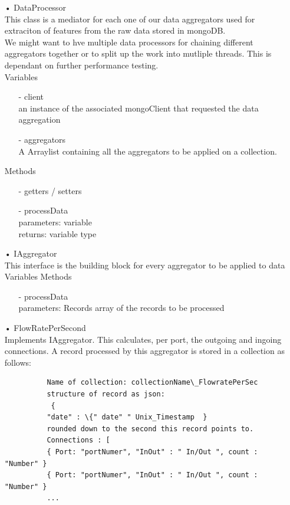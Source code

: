\documentclass[oneside, english, final]{design}
\begin{document}
\begin{itemize}
	\item[•]DataProcessor
	      \\This class is a mediator for each one of our data aggregators used for extraciton of features from the raw data stored in mongoDB.
	      \\ We might want to hve multiple data processors for chaining different aggregators together or to split up the work into mutliple threads. This is dependant on further performance testing.
	      \\Variables
	      \begin{itemize}
		      \item[-] client
		            \\ an instance of the associated mongoClient that requested the data aggregation
		      \item[-] aggregators
		            \\ A Arraylist containing all the aggregators to be applied on a collection.
	      \end{itemize}
	      Methods
	      \begin{itemize}
		      \item[-]getters / setters
		      \item[-]processData
		            \\parameters: variable
		            \\returns: variable type
	      \end{itemize}
	\item[•] IAggregator
	      \\This interface is the building block for every aggregator to be applied to data
	      \\Variables
	      Methods
	      \begin{itemize}
		      \item[-]processData
		            \\parameters: Records array of the records to be processed
	      \end{itemize}

	\item[•] FlowRatePerSecond
	      \\Implements IAggregator. This calculates, per port, the outgoing and ingoing connections.
	      A record processed by this aggregator is stored in a collection as follows:
	      \begin{verbatim} 
		  Name of collection: collectionName\_FlowratePerSec
		  structure of record as json:
		   {
		  "date" : \{" date" " Unix_Timestamp  } 
		  rounded down to the second this record points to.
		  Connections : [
		  { Port: "portNumer", "InOut" : " In/Out ", count : "Number" }
		  { Port: "portNumer", "InOut" : " In/Out ", count : "Number" }
		  ...
		  

\end{verbatim}
\end{itemize}
\end{document}
